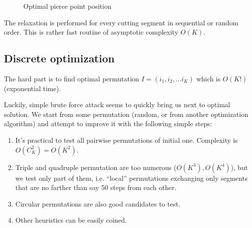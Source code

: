 \documentclass{../download/tPRS2e}
\begin{document}
\begin{figure}
    \begin{center}
    \caption{Optimal pierce point position} \label{fermat}
    \end{center}    
\end{figure}
    
The relaxation is performed for every cutting segment
in sequential or random order.
This is rather fast routine
of asymptotic complexity
$O(K)$.

\subsection{Discrete optimization}

The hard part is to find optimal permutation
$I = (i_1, i_2, \dots i_K)$
which is $O(K!)$
(exponential time).

Luckily,
simple brute force attack seems
to quickly bring us next to optimal solution.
We start from some permutation
(random, or from another optimization algorithm)
and attempt to improve it with the following simple steps:

\begin{enumerate}
    \item{}
    It's practical to test all pairwise permutations of initial one.
    Complexity is $O(C_K^2) = O(K^2)$.
    \item{}
    Triple and quadruple permutation are too numerous
    ($O(K^3), O(K^4)$),
    but we test only part of them,
    i.e. ``local'' permutations
    exchanging only segments that are no farther
    than say 50 steps from each other.
    \item{}
    Circular permutations are also good candidates to test.
    \item{}
    Other heuristics can be easily coined.
\end{enumerate}
\end{document}
